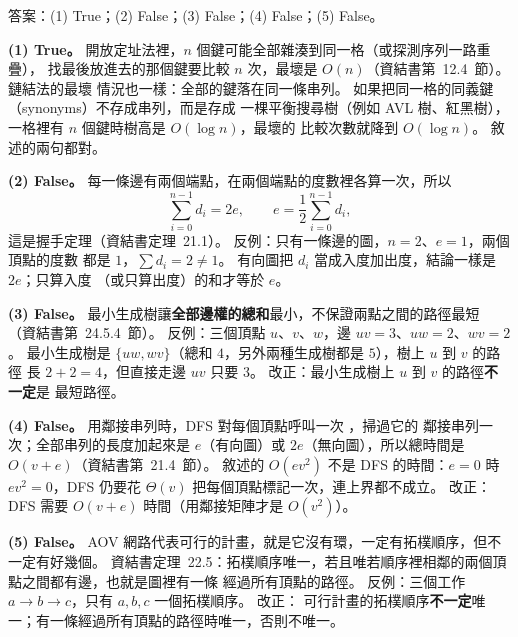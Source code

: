 \begin{pastsoln}
答案：(1) True；(2) False；(3) False；(4) False；(5) False。

\textbf{(1) True。} 開放定址法裡，$n$ 個鍵可能全部雜湊到同一格（或探測序列一路重疊），
找最後放進去的那個鍵要比較 $n$ 次，最壞是 $O(n)$（資結書第~12.4~節）。 鏈結法的最壞
情況也一樣：全部的鍵落在同一條串列。 如果把同一格的同義鍵（synonyms）不存成串列，而是存成
一棵平衡搜尋樹（例如 AVL 樹、紅黑樹），一格裡有 $n$ 個鍵時樹高是 $O(\log n)$，最壞的
比較次數就降到 $O(\log n)$。 敘述的兩句都對。

\textbf{(2) False。} 每一條邊有兩個端點，在兩個端點的度數裡各算一次，所以
\[
\sum_{i=0}^{n-1} d_i = 2e, \qquad e = \frac12 \sum_{i=0}^{n-1} d_i,
\]
這是握手定理（資結書定理~21.1）。 反例：只有一條邊的圖，$n = 2$、$e = 1$，兩個頂點的度數
都是 $1$，$\sum d_i = 2 \ne 1$。 有向圖把 $d_i$ 當成入度加出度，結論一樣是 $2e$；只算入度
（或只算出度）的和才等於 $e$。

\textbf{(3) False。} 最小生成樹讓\textbf{全部邊權的總和}最小，不保證兩點之間的路徑最短
（資結書第~24.5.4~節）。 反例：三個頂點 $u$、$v$、$w$，邊 $uv = 3$、$uw = 2$、$wv = 2$。
最小生成樹是 $\{uw, wv\}$（總和 $4$，另外兩種生成樹都是 $5$），樹上 $u$ 到 $v$ 的路徑
長 $2 + 2 = 4$，但直接走邊 $uv$ 只要 $3$。 改正：最小生成樹上 $u$ 到 $v$ 的路徑\textbf{不一定}是
最短路徑。

\textbf{(4) False。} 用鄰接串列時，DFS 對每個頂點呼叫一次 ，掃過它的
鄰接串列一次；全部串列的長度加起來是 $e$（有向圖）或 $2e$（無向圖），所以總時間是
$O(v + e)$（資結書第~21.4~節）。 敘述的 $O(ev^2)$ 不是 DFS 的時間：$e = 0$ 時
$ev^2 = 0$，DFS 仍要花 $\Theta(v)$ 把每個頂點標記一次，連上界都不成立。 改正：DFS 需要
$O(v + e)$ 時間（用鄰接矩陣才是 $O(v^2)$）。

\textbf{(5) False。} AOV 網路代表可行的計畫，就是它沒有環，一定有拓樸順序，但不一定有好幾個。
資結書定理~22.5：拓樸順序唯一，若且唯若順序裡相鄰的兩個頂點之間都有邊，也就是圖裡有一條
經過所有頂點的路徑。 反例：三個工作 $a \to b \to c$，只有 $a, b, c$ 一個拓樸順序。 改正：
可行計畫的拓樸順序\textbf{不一定}唯一；有一條經過所有頂點的路徑時唯一，否則不唯一。
\end{pastsoln}
